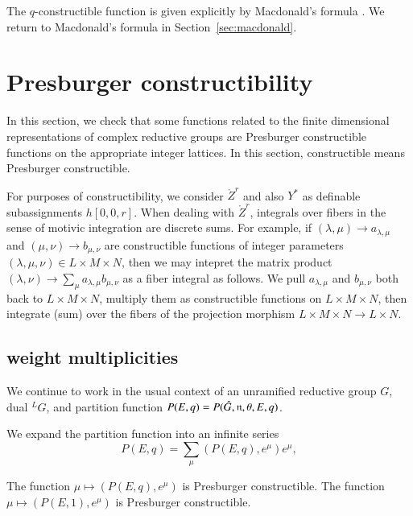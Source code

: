 The $q$-constructible function is given explicitly by Macdonald's
formula \cite{casselman1980unramified}.  We return to Macdonald's
formula in Section~\ref{sec:macdonald}.


\section{Presburger constructibility}

In this section, we check that some functions related to the finite
dimensional representations of complex reductive groups are Presburger
constructible functions on the appropriate integer lattices.  In this
section, constructible means Presburger constructible.

\begin{remark}\label{rem:matrix}
  For purposes of constructibility, we consider $\ring{Z}^r$ and also
  $Y^*$ as definable subassignments $h[0,0,r]$. When dealing with
  $\ring{Z}^r$, integrals over fibers in the sense of motivic
  integration are discrete sums.  For example, if $(\lambda,\mu)\to
  a_{\lambda,\mu}$ and $(\mu,\nu)\to b_{\mu,\nu}$ are constructible
  functions of integer parameters $(\lambda,\mu,\nu)\in L\times
  M\times N$, then we may intepret the matrix product
  $(\lambda,\nu)\to \sum_{\mu} a_{\lambda,\mu} b_{\mu,\nu}$ as a fiber
  integral as follows.  We pull $a_{\lambda,\mu}$ and $b_{\mu,\nu}$
  both back to $L\times M\times N$, multiply them as constructible
  functions on $L\times M\times N$, then integrate (sum) over the
  fibers of the projection morphism $L\times M\times N\to L\times N$.
\end{remark}


\subsection{weight multiplicities}

We continue to work in the usual context of an unramified reductive
group $G$, dual ${}^LG$, and partition function
$P(E,q)=P(\hat G,{\mathfrak n},\theta,E,q)$.

We expand the partition function into an infinite series
\[
P(E,q) = \sum_\mu (P(E,q),e^\mu) e^{\mu},
\]

\begin{lemma}\label{lemma:partition}
  The function $\mu\mapsto (P(E,q),e^\mu)$ is Presburger
  constructible.  The function $\mu\mapsto (P(E,1),e^\mu)$ is
  Presburger constructible.
\end{lemma}

